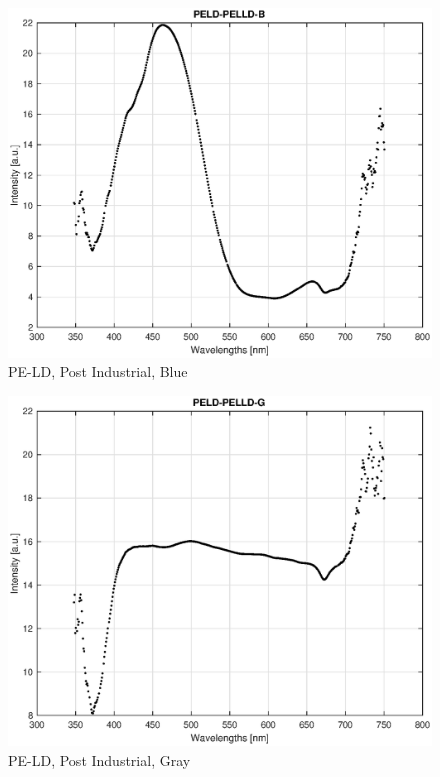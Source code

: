 \begin{appendices}
\begin{figure}
    \centering
    \includegraphics[width = 12cm]{Images/appendix/pe-ld-postindust-blue.eps}
    \caption[$\; \:$PE-LD Post Industrial, Blue]{PE-LD, Post Industrial, Blue}
\end{figure}

\begin{figure}
    \centering
    \includegraphics[width = 12cm]{Images/appendix/pe-ld-postindust-gray.eps}
    \caption[$\; \:$PE-LD Post Industrial, Gray]{PE-LD, Post Industrial, Gray}
\end{figure}


\end{appendices}
